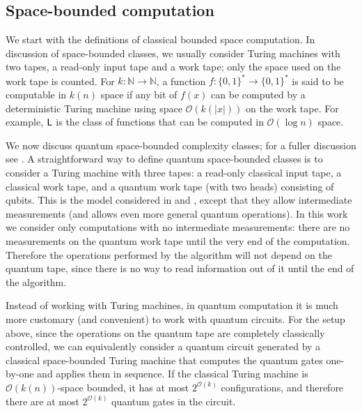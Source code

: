\documentclass[11pt]{article}
\newtheorem{theorem}{Theorem}
\theoremstyle{definition}
\theoremstyle{remark}
\theoremstyle{definition}
\newcommand\Logspace{{\sf{L}}}
\newcommand\bigoh{\mathcal{O}}
\begin{document}
\subsection{Space-bounded computation} \label{sec: space bounded computation}
We start with the definitions of classical bounded space computation. In discussion of space-bounded classes, we usually consider Turing machines with two tapes, a read-only input tape and a work tape; only the space used on the work tape is counted. For $k:\mathbb{N}\rightarrow\mathbb{N}$, a function $f:\{0,1\}^{*}\rightarrow\{0,1\}^*$ is said to be computable in $k(n)$ space if any bit of $f(x)$ can be computed by a deterministic Turing machine using space $\bigoh(k(|x|))$ on the work tape.  For example, $\Logspace$ is the class of functions that can be computed in $\bigoh(\log{n})$ space.

We now discuss quantum space-bounded complexity classes; for a fuller discussion see \cite{Watrous09}. A straightforward way to define quantum space-bounded classes is to consider a Turing machine with three tapes: a read-only classical input tape, a classical work tape, and a quantum work tape (with two heads) consisting of qubits. This is the model considered in \cite{tashma} and \cite{Watrous03}, except that they allow intermediate measurements (and \cite{Watrous03} allows even more general quantum operations). In this work we consider only computations with no intermediate measurements: there are no measurements on the quantum work tape until the very end of the computation. Therefore the operations performed by the algorithm will not depend on the quantum tape, since there is no way to read information out of it until the end of the algorithm.

Instead of working with Turing machines, in quantum computation it is much more customary (and convenient) to work with quantum circuits. For the setup above, since the operations on the quantum tape are completely classically controlled, we can equivalently consider a quantum circuit generated by a classical space-bounded Turing machine that computes the quantum gates one-by-one and applies them in sequence. If the classical Turing machine is $\mathcal{O}(k(n))$-space bounded, it has at most $2^{\mathcal{O}(k)}$ configurations, and therefore there are at most $2^{\mathcal{O}(k)}$ quantum gates in the circuit. 
\end{document}
